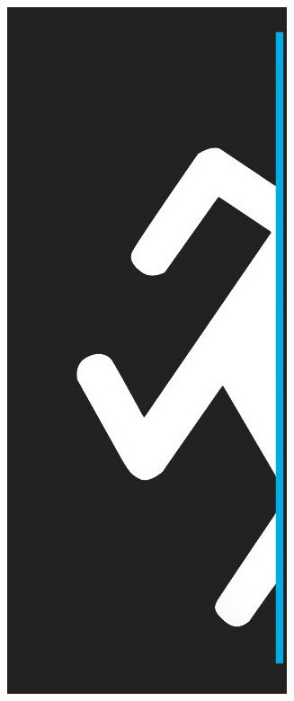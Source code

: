 \documentclass[a5paper,12pt,twoside]{article}
\begin{document}
\newpage
\thispagestyle{empty}

\vspace*{0.4cm}
\begin{figure}[H]
\centering
    \includegraphics[scale=0.6]{BackCover.jpg}
\end{figure}
\end{document}

